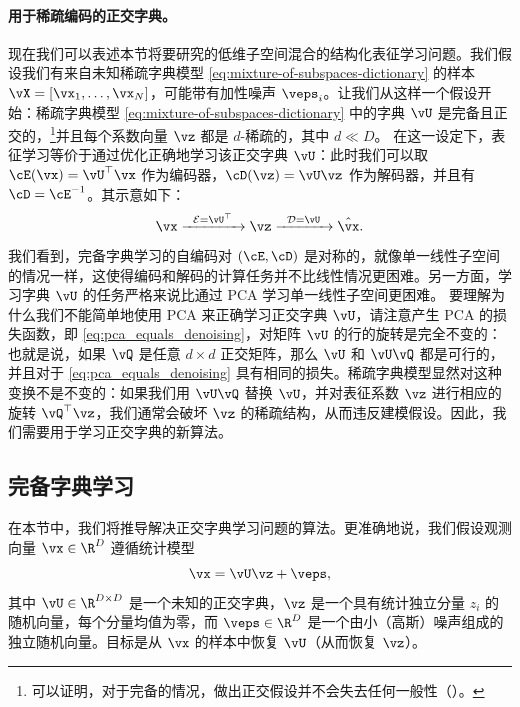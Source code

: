 \documentclass[../../book-main_zh.tex]{subfiles}
\begin{document}
\paragraph{用于稀疏编码的正交字典。}
现在我们可以表述本节将要研究的低维子空间混合的结构化表征学习问题。我们假设我们有来自未知稀疏字典模型
\eqref{eq:mixture-of-subspaces-dictionary} 的样本 $\vX = [\vx_1, \dots,
\vx_N]$，可能带有加性噪声 $\veps_i$。让我们从这样一个假设开始：稀疏字典模型
\eqref{eq:mixture-of-subspaces-dictionary} 中的字典 $\vU$
是完备且正交的，\footnote{可以证明，对于完备的情况，做出正交假设并不会失去任何一般性（）。}并且每个系数向量
$\vz$ 都是 $d$-稀疏的，其中 $d \ll D$。
在这一设定下，表征学习等价于通过优化正确地学习该正交字典 $\vU$：此时我们可以取 $\cE(\vx) = \vU^\top \vx$ 作为编码器，$\cD(\vz) = \vU \vz$ 作为解码器，并且有 $\cD = \cE^{-1}$。其示意如下：
\begin{equation}
    \vx \xrightarrow{\hspace{2mm} \mathcal{E} = \vU^\top
    \hspace{2mm}}  \vz \xrightarrow{\hspace{2mm} \mathcal{D} = \vU
    \hspace{2mm}}   \hat{\vx}.
    \label{eqn:autoencoding-DL}
\end{equation}
我们看到，完备字典学习的自编码对 $(\cE, \cD)$
是对称的，就像单一线性子空间的情况一样，这使得编码和解码的计算任务并不比线性情况更困难。另一方面，学习字典 $\vU$
的任务严格来说比通过 PCA 学习单一线性子空间更困难。
要理解为什么我们不能简单地使用 PCA 来正确学习正交字典 $\vU$，请注意产生 PCA 的损失函数，即
\eqref{eq:pca_equals_denoising}，对矩阵 $\vU$ 的行的旋转是完全不变的：也就是说，如果 $\vQ$
是任意 $d \times d$ 正交矩阵，那么 $\vU$ 和 $\vU \vQ$ 都是可行的，并且对于
\eqref{eq:pca_equals_denoising} 具有相同的损失。稀疏字典模型显然对这种变换不是不变的：如果我们用 $\vU
\vQ$ 替换 $\vU$，并对表征系数 $\vz$ 进行相应的旋转 $\vQ^\top \vz$，我们通常会破坏 $\vz$
的稀疏结构，从而违反建模假设。因此，我们需要用于学习正交字典的新算法。

\subsection{完备字典学习}
\label{sec:complete-dictionary}

在本节中，我们将推导解决正交字典学习问题的算法。更准确地说，我们假设观测向量 $\vx \in \R^D$ 遵循统计模型
\begin{equation}
    \vx = \vU \vz + \veps,
    \label{eq:ica-model-ch2}
\end{equation}
其中 $\vU \in \R^{D \times D}$ 是一个未知的正交字典，$\vz$ 是一个具有统计独立分量 $z_i$
的随机向量，每个分量均值为零，而 $\veps \in \R^D$ 是一个由小（高斯）噪声组成的独立随机向量。目标是从 $\vx$
的样本中恢复 $\vU$（从而恢复 $\vz$）。
\end{document}
